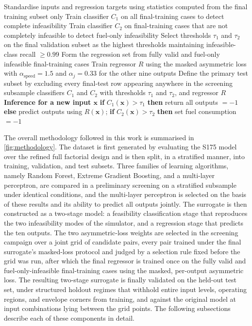 \documentclass[final,5p,times,twocolumn,numbers]{elsarticle}
\begin{document}
\begin{algorithm}[ht!]
\begin{algorithmic}[1]
\State Standardise inputs and regression targets using statistics computed from the final training subset only
\State Train classifier $C_1$ on all final-training cases to detect complete infeasibility
\State Train classifier $C_2$ on final-training cases that are not completely infeasible to detect fuel-only infeasibility
\State Select thresholds $\tau_1$ and $\tau_2$ on the final validation subset as the highest thresholds maintaining infeasible-class recall $\geq0.99$
\State Form the regression set from fully valid and fuel-only infeasible final-training cases
\State Train regressor $R$ using the masked asymmetric loss with $\alpha_{\mathrm{speed}}=1.5$ and $\alpha_j=0.33$ for the other nine outputs
\State Define the primary test subset by excluding every final-test row appearing anywhere in the screening subsample
\State \Return classifiers $C_1$ and $C_2$ with thresholds $\tau_1$ and $\tau_2$, and regressor $R$
\Statex \textbf{Inference for a new input $\mathbf{x}$}
\State \textbf{if} $C_1(\mathbf{x})>\tau_1$ \textbf{then} return all outputs $=-1$
\State \textbf{else} predict outputs using $R(\mathbf{x})$; \textbf{if} $C_2(\mathbf{x})>\tau_2$ \textbf{then} set fuel consumption $=-1$
\end{algorithmic}
\vspace{-3pt}

\end{algorithm}

The overall methodology followed in this work is summarised in \autoref{fig:methodology}. The dataset is first generated by evaluating the S175 model over the refined full factorial design and is then split, in a stratified manner, into training, validation, and test subsets. Three families of learning algorithms, namely Random Forest, Extreme Gradient Boosting, and a multi-layer perceptron, are compared in a preliminary screening on a stratified subsample under identical conditions, and the multi-layer perceptron is selected on the basis of these results and its ability to predict all outputs jointly. The surrogate is then constructed as a two-stage model: a feasibility classification stage that reproduces the two infeasibility modes of the simulator, and a regression stage that predicts the ten outputs. The two asymmetric-loss weights are selected in the screening campaign over a joint grid of candidate pairs, every pair trained under the final surrogate's masked-loss protocol and judged by a selection rule fixed before the grid was run, after which the final regressor is trained once on the fully valid and fuel-only-infeasible final-training cases using the masked, per-output asymmetric loss. The resulting two-stage surrogate is finally validated on the held-out test set, under structured holdout regimes that withhold entire input levels, operating regions, and envelope corners from training, and against the original model at input combinations lying between the grid points. The following subsections describe each of these components in detail.
\end{document}
